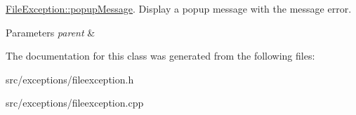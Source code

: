 \hyperlink{classExceptions_1_1FileException_aba824967d55e0a9a29c23521d87f05dd}{File\+Exception\+::popup\+Message}. Display a popup message with the message error. 


\begin{DoxyParams}{Parameters}
{\em parent} & \\
\hline
\end{DoxyParams}


The documentation for this class was generated from the following files\+:\begin{DoxyCompactItemize}
\item 
src/exceptions/fileexception.\+h\item 
src/exceptions/fileexception.\+cpp\end{DoxyCompactItemize}
